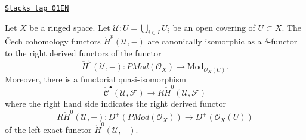 \begin{lemma}
\label{cohomology-lemma-cech-cohomology-derived-presheaves}
\href{https://stacks.math.columbia.edu/tag/01EN}{\texttt{Stacks tag 01EN}}

Let $X$ be a ringed space.
Let $\mathcal{U} : U = \bigcup_{i \in I} U_i$
be an open covering of $U \subset X$.
The {\v C}ech cohomology functors $\check{H}^p(\mathcal{U}, -)$
are canonically isomorphic as a $\delta$-functor to
the right derived functors of the functor
$$
\check{H}^0(\mathcal{U}, -) :
\textit{PMod}(\mathcal{O}_X)
\longrightarrow
\text{Mod}_{\mathcal{O}_X(U)}.
$$
Moreover, there is a functorial quasi-isomorphism
$$
\check{\mathcal{C}}^\bullet(\mathcal{U}, \mathcal{F})
\longrightarrow
R\check{H}^0(\mathcal{U}, \mathcal{F})
$$
where the right hand side indicates the right derived functor
$$
R\check{H}^0(\mathcal{U}, -) :
D^{+}(\textit{PMod}(\mathcal{O}_X))
\longrightarrow
D^{+}(\mathcal{O}_X(U))
$$
of the left exact functor $\check{H}^0(\mathcal{U}, -)$.
\end{lemma}

